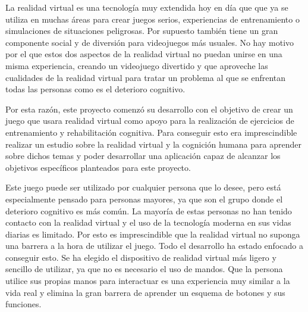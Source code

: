 











La realidad virtual es una tecnología muy extendida hoy en día que que ya se utiliza en muchas áreas para crear juegos serios, experiencias de entrenamiento o simulaciones de situaciones peligrosas. Por supuesto también tiene un gran componente social y de diversión para videojuegos más usuales. No hay motivo por el que estos dos aspectos de la realidad virtual no puedan unirse en una misma experiencia, creando un videojuego divertido y que aproveche las cualidades de la realidad virtual para tratar un problema al que se enfrentan todas las personas como es el deterioro cognitivo.

Por esta razón, este proyecto comenzó su desarrollo con el objetivo de crear un juego que usara realidad virtual como apoyo para la realización de ejercicios de entrenamiento y rehabilitación cognitiva. Para conseguir esto era imprescindible realizar un estudio sobre la realidad virtual y la cognición humana para aprender sobre dichos temas y poder desarrollar una aplicación capaz de alcanzar los objetivos específicos planteados para este proyecto. 

Este juego puede ser utilizado por cualquier persona que lo desee, pero está especialmente pensado para personas mayores, ya que son el grupo donde el deterioro cognitivo es más común. La mayoría de estas personas no han tenido contacto con la realidad virtual y el uso de la tecnología moderna en sus vidas diarias es limitado. Por esto es imprescindible que la realidad virtual no suponga una barrera a la hora de utilizar el juego. Todo el desarrollo ha estado enfocado a conseguir esto. Se ha elegido el dispositivo de realidad virtual más ligero y sencillo de utilizar, ya que no es necesario el uso de mandos. Que la persona utilice sus propias manos para interactuar es una experiencia muy similar a la vida real y elimina la gran barrera de aprender un esquema de botones y sus funciones.

